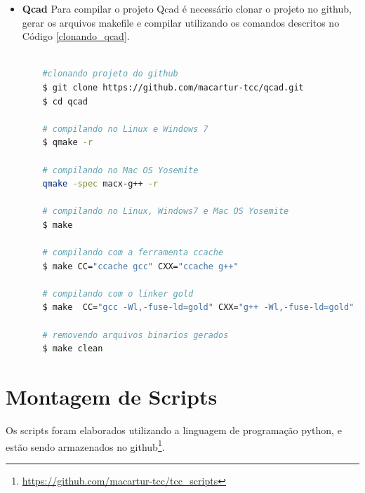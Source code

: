 \begin{itemize}
\begin{lstlisting}[language=bash, caption={Clonado Projeto Aseprite e criando diretório de Compilação},
                  label=clonando_aseprite]
    # compilando projeto com ccache no Mac OS Yosemite
    $ cmake -G .. "Unix Makefiles"  -DCMAKE_CXX_COMPILER="ccache"  -DCMAKE_CXX_COMPILER_ARG1="g++" -DCMAKE_C_COMPILER="ccache" -DCMAKE_C_COMPILER_ARG1="gcc"  -DCMAKE_OSX_ARCHITECTURES:STRING=i386  -DCMAKE_OSX_DEPLOYMENT_TARGET:STRING=10.4  -DCMAKE_OSX_SYSROOT:STRING=/SDKs/MacOSX10.4u.sdk

    # compilando com o linker gold no Linux
    $ CC="gcc  -Wl,-fuse-ld=gold" CXX="g++ -Wl,-fuse-ld=gold" cmake .. -G "Unix Makefiles"

    # removendo arquivos binarios
    $ make clean

\end{lstlisting}

    \item \textbf{Qcad}
    \subitem Para compilar o projeto Qcad é necessário clonar o
 projeto no github, gerar os arquivos makefile e compilar
 utilizando os comandos descritos no Código \ref{clonando_qcad}.

\begin{lstlisting}[language=bash, caption={Clonado Projeto Qcad},
                  label=clonando_qcad]

    #clonando projeto do github
    $ git clone https://github.com/macartur-tcc/qcad.git
    $ cd qcad

    # compilando no Linux e Windows 7
    $ qmake -r
    
    # compilando no Mac OS Yosemite
    qmake -spec macx-g++ -r

    # compilando no Linux, Windows7 e Mac OS Yosemite
    $ make

    # compilando com a ferramenta ccache
    $ make CC="ccache gcc" CXX="ccache g++"

    # compilando com o linker gold
    $ make  CC="gcc -Wl,-fuse-ld=gold" CXX="g++ -Wl,-fuse-ld=gold"

    # removendo arquivos binarios gerados
    $ make clean

\end{lstlisting}
\end{itemize}

\section{Montagem de Scripts}


Os scripts foram elaborados utilizando a linguagem de programação python,
 e estão sendo armazenados no github\footnote{\url{https://github.com/macartur-tcc/tcc_scripts}}.


